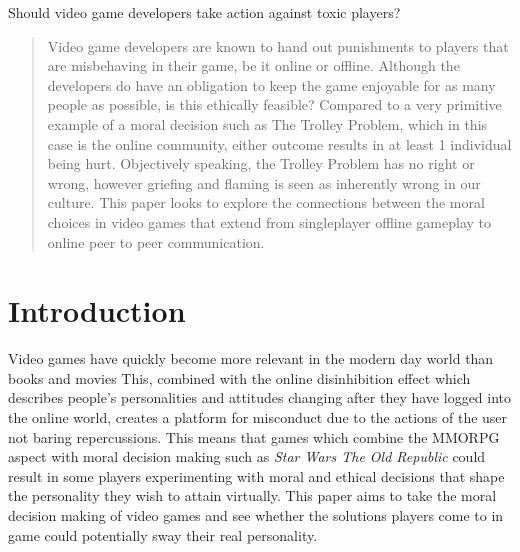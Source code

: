 \documentclass[12pt]{article}
\begin{document}
\maketitle
Should video game developers take action against toxic players?

\begin{abstract}
Video game developers are known to hand out punishments to players that are misbehaving in their game, be it online or offline. Although the developers do have an obligation to keep the game enjoyable for as many people as possible, is this ethically feasible? Compared to a very primitive example of a moral decision such as The Trolley Problem, which in this case is the online community, either outcome results in at least 1 individual being hurt. Objectively speaking, the Trolley Problem has no right or wrong, however griefing and flaming is seen as inherently wrong in our culture. This paper looks to explore the connections between the moral choices in video games that extend from singleplayer offline gameplay to online peer to peer communication.
\end{abstract}


\section{Introduction}
Video games have quickly become more relevant in the modern day world than books and movies \cite{nath_2016} This, combined with the online disinhibition effect which describes people's personalities and attitudes changing after they have logged into the online world\cite{Zim}, creates a platform for misconduct due to the actions of the user not baring repercussions. This means that games which combine the MMORPG aspect with moral decision making such as \textit{Star Wars The Old Republic} could result in some players experimenting with moral and ethical decisions that shape the personality they wish to attain virtually. This paper aims to take the moral decision making of video games and see whether the solutions players come to in game could potentially sway their real personality.
\end{document}
